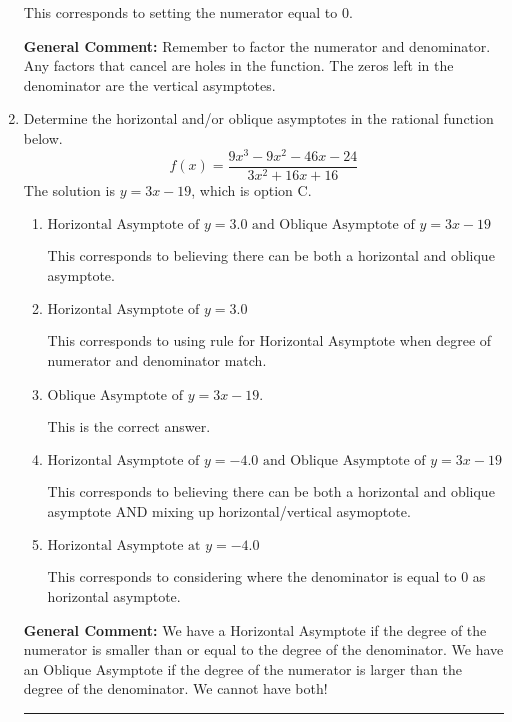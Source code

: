 \documentclass{extbook}[14pt]
\newcommand{\litem}[1]{\item #1

\rule{\textwidth}{0.4pt}}
\begin{document}
\begin{enumerate}
{\begin{enumerate}[label=\Alph*.]
This corresponds to setting the numerator equal to 0.
\end{enumerate}

\textbf{General Comment:} Remember to factor the numerator and denominator. Any factors that cancel are holes in the function. The zeros left in the denominator are the vertical asymptotes.
}
\litem{
Determine the horizontal and/or oblique asymptotes in the rational function below.
\[ f(x) = \frac{9x^{3} -9 x^{2} -46 x -24}{3x^{2} +16 x + 16} \]The solution is \( y = 3x -19 \), which is option C.\begin{enumerate}[label=\Alph*.]
\item \( \text{Horizontal Asymptote of } y = 3.0 \text{ and Oblique Asymptote of } y = 3x -19 \)

This corresponds to believing there can be both a horizontal and oblique asymptote.
\item \( \text{Horizontal Asymptote of } y = 3.0  \)

This corresponds to using rule for Horizontal Asymptote when degree of numerator and denominator match.
\item \( \text{Oblique Asymptote of } y = 3x -19. \)

This is the correct answer.
\item \( \text{Horizontal Asymptote of } y = -4.0 \text{ and Oblique Asymptote of } y = 3x -19 \)

This corresponds to believing there can be both a horizontal and oblique asymptote AND mixing up horizontal/vertical asymoptote.
\item \( \text{Horizontal Asymptote at } y = -4.0 \)

This corresponds to considering where the denominator is equal to 0 as horizontal asymptote.
\end{enumerate}

\textbf{General Comment:} We have a Horizontal Asymptote if the degree of the numerator is smaller than or equal to the degree of the denominator. We have an Oblique Asymptote if the degree of the numerator is larger than the degree of the denominator. We cannot have both!
}
\end{enumerate}
\end{document}
